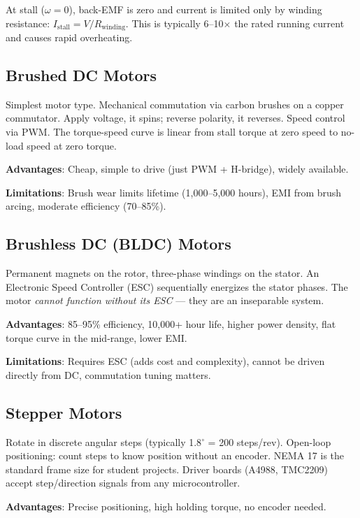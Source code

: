\documentclass[11pt,letterpaper,twoside,openany]{book}
\providecommand{\ang}[1]{#1\ensuremath{{}^{\circ}}}
\begin{document}
At stall ($\omega = 0$), back-EMF is zero and current is limited only by winding resistance: $I_{\text{stall}} = V / R_{\text{winding}}$. This is typically 6--10$\times$ the rated running current and causes rapid overheating.

\subsection{Brushed DC Motors}

Simplest motor type. Mechanical commutation via carbon brushes on a copper commutator. Apply voltage, it spins; reverse polarity, it reverses. Speed control via PWM. The torque-speed curve is linear from stall torque at zero speed to no-load speed at zero torque.

\textbf{Advantages}: Cheap, simple to drive (just PWM + H-bridge), widely available.

\textbf{Limitations}: Brush wear limits lifetime (1,000--5,000 hours), EMI from brush arcing, moderate efficiency (70--85\%).

\subsection{Brushless DC (BLDC) Motors}

Permanent magnets on the rotor, three-phase windings on the stator. An Electronic Speed Controller (ESC) sequentially energizes the stator phases. The motor \emph{cannot function without its ESC} --- they are an inseparable system.

\textbf{Advantages}: 85--95\% efficiency, 10,000+ hour life, higher power density, flat torque curve in the mid-range, lower EMI.

\textbf{Limitations}: Requires ESC (adds cost and complexity), cannot be driven directly from DC, commutation tuning matters.

\subsection{Stepper Motors}

Rotate in discrete angular steps (typically \ang{1.8} = 200 steps/rev). Open-loop positioning: count steps to know position without an encoder. NEMA 17 is the standard frame size for student projects. Driver boards (A4988, TMC2209) accept step/direction signals from any microcontroller.

\textbf{Advantages}: Precise positioning, high holding torque, no encoder needed.
\end{document}
